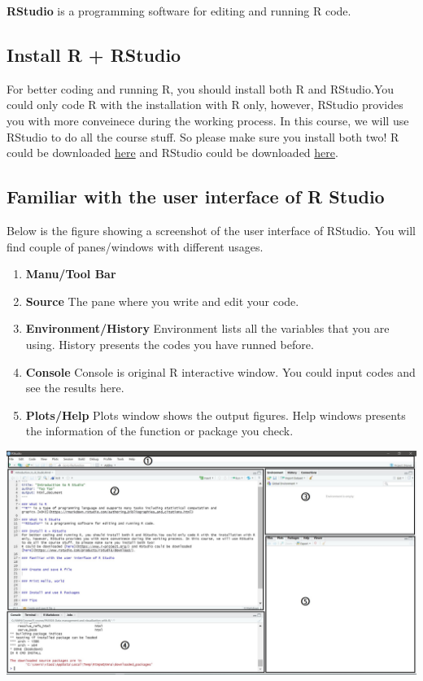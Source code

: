 \documentclass[]{book}
\providecommand{\tightlist}{%
  \setlength{\itemsep}{0pt}\setlength{\parskip}{0pt}}
\begin{document}
\textbf{RStudio} is a programming software for editing and running R code.

\hypertarget{install-r-rstudio}{%
\subsection{Install R + RStudio}\label{install-r-rstudio}}

For better coding and running R, you should install both R and RStudio.You could only code R with the installation with R only, however, RStudio provides you with more conveinece during the working process. In this course, we will use RStudio to do all the course stuff. So please make sure you install both two!
R could be downloaded \href{https://www.r-project.org/}{here} and RStudio could be downloaded \href{https://www.rstudio.com/products/rstudio/download/}{here}.

\hypertarget{familiar-with-the-user-interface-of-r-studio}{%
\subsection{Familiar with the user interface of R Studio}\label{familiar-with-the-user-interface-of-r-studio}}

Below is the figure showing a screenshot of the user interface of RStudio. You will find couple of panes/windows with different usages.

\begin{enumerate}
\def\labelenumi{\arabic{enumi}.}
\tightlist
\item
  \textbf{Manu/Tool Bar}
\item
  \textbf{Source} The pane where you write and edit your code.
\item
  \textbf{Environment/History} Environment lists all the variables that you are using. History presents the codes you have runned before.
\item
  \textbf{Console} Console is original R interactive window. You could input codes and see the results here.
\item
  \textbf{Plots/Help} Plots window shows the output figures. Help windows presents the information of the function or package you check.
\end{enumerate}

\includegraphics{Pics/RStudio.JPG}
\end{document}

